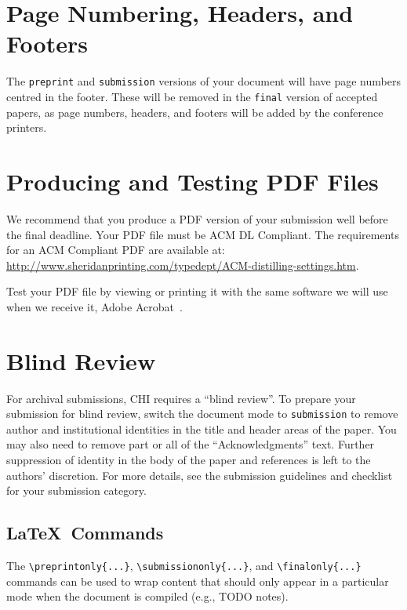 \documentclass[preprint]{../latex/sigchi-modern}
\begin{document}
\section{Page Numbering, Headers, and Footers}
The \texttt{preprint} and \texttt{submission} versions of your document will
have page numbers centred in the footer. These will be removed in the
\texttt{final} version of accepted papers, as page numbers, headers, and footers
will be added by the conference printers.

\section{Producing and Testing PDF Files}
We recommend that you produce a PDF version of your submission well
before the final deadline. Your PDF file must be ACM DL Compliant. The
requirements for an ACM Compliant PDF are available at:
{\url{http://www.sheridanprinting.com/typedept/ACM-distilling-settings.htm}}.

Test your PDF file by viewing or printing it with the same software we will use
when we receive it, Adobe Acrobat~\cite{acrobat}.

%
%
\balance

\section{Blind Review}
For archival submissions, CHI requires a ``blind review''. To prepare your
submission for blind review, switch the document mode to \texttt{submission} to
remove author and institutional identities in the title and header areas of the
paper. You may also need to remove part or all of the ``Acknowledgments'' text.
Further suppression of identity in the body of the paper and references is left
to the authors' discretion. For more details, see the submission guidelines and
checklist for your submission category.

\subsection{\LaTeX\ Commands}
The \texttt{\textbackslash preprintonly\{...\}},
\texttt{\textbackslash sub\-mis\-sion\-only\{...\}}, and
\texttt{\textbackslash finalonly\{...\}} commands can be used to wrap content
that should only appear in a particular mode when the document is compiled
(e.g., TODO notes).
\end{document}

